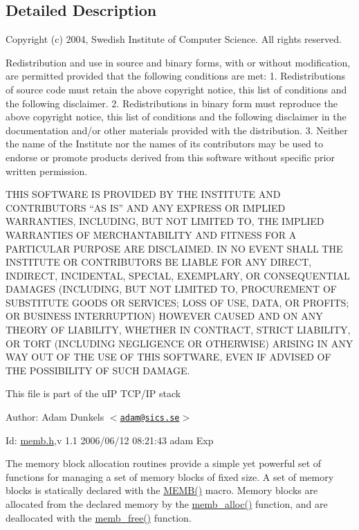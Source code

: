 \subsection{Detailed Description}
Copyright (c) 2004, Swedish Institute of Computer Science. All rights reserved.

Redistribution and use in source and binary forms, with or without modification, are permitted provided that the following conditions are met: 1. Redistributions of source code must retain the above copyright notice, this list of conditions and the following disclaimer. 2. Redistributions in binary form must reproduce the above copyright notice, this list of conditions and the following disclaimer in the documentation and/or other materials provided with the distribution. 3. Neither the name of the Institute nor the names of its contributors may be used to endorse or promote products derived from this software without specific prior written permission.

THIS SOFTWARE IS PROVIDED BY THE INSTITUTE AND CONTRIBUTORS ``AS IS'' AND ANY EXPRESS OR IMPLIED WARRANTIES, INCLUDING, BUT NOT LIMITED TO, THE IMPLIED WARRANTIES OF MERCHANTABILITY AND FITNESS FOR A PARTICULAR PURPOSE ARE DISCLAIMED. IN NO EVENT SHALL THE INSTITUTE OR CONTRIBUTORS BE LIABLE FOR ANY DIRECT, INDIRECT, INCIDENTAL, SPECIAL, EXEMPLARY, OR CONSEQUENTIAL DAMAGES (INCLUDING, BUT NOT LIMITED TO, PROCUREMENT OF SUBSTITUTE GOODS OR SERVICES; LOSS OF USE, DATA, OR PROFITS; OR BUSINESS INTERRUPTION) HOWEVER CAUSED AND ON ANY THEORY OF LIABILITY, WHETHER IN CONTRACT, STRICT LIABILITY, OR TORT (INCLUDING NEGLIGENCE OR OTHERWISE) ARISING IN ANY WAY OUT OF THE USE OF THIS SOFTWARE, EVEN IF ADVISED OF THE POSSIBILITY OF SUCH DAMAGE.

This file is part of the uIP TCP/IP stack

Author: Adam Dunkels $<$\href{mailto:adam@sics.se}{\tt adam@sics.se}$>$

\begin{DoxyParagraph}{Id:}
\hyperlink{memb_8h}{memb.h},v 1.1 2006/06/12 08:21:43 adam Exp 
\end{DoxyParagraph}


The memory block allocation routines provide a simple yet powerful set of functions for managing a set of memory blocks of fixed size. A set of memory blocks is statically declared with the \hyperlink{group__telnetd_ga8505bcbff8774c99458a328d8d2e9bc0}{MEMB()} macro. Memory blocks are allocated from the declared memory by the \hyperlink{group__memb_gafe5e93119035e14cc485760a176249ba}{memb\_\-alloc()} function, and are deallocated with the \hyperlink{group__memb_gaceb952d27de8125d5146ac0bee325b8f}{memb\_\-free()} function.

